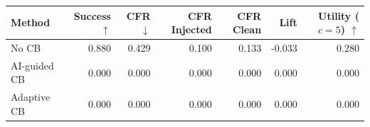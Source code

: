\begin{tabular}{lrrrrrr}
\toprule
Method & Success $\uparrow$ & CFR $\downarrow$ & CFR Injected & CFR Clean & Lift & Utility ($c=5$) $\uparrow$ \\
\midrule
No CB & 0.880 & 0.429 & 0.100 & 0.133 & -0.033 & 0.280 \\
AI-guided CB & 0.000 & 0.000 & 0.000 & 0.000 & 0.000 & 0.000 \\
Adaptive CB & 0.000 & 0.000 & 0.000 & 0.000 & 0.000 & 0.000 \\
\bottomrule
\end{tabular}
